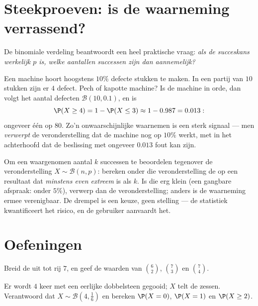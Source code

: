 \section{Steekproeven: is de waarneming verrassend?}

De binomiale verdeling beantwoordt een heel praktische vraag: \emph{als de
succeskans werkelijk $p$ is, welke aantallen successen zijn dan
aannemelijk?}

\begin{example}\label{ex:g11:binom:decision}
Een machine hoort hoogstens $10\%$ defecte stukken te maken. In een partij
van $10$ stukken zijn er $4$ defect. Pech of kapotte machine? Is de machine
in orde, dan volgt het aantal defecten $\mathcal B(10, 0.1)$, en is
\[
\P(X \geq 4) = 1 - \P(X \leq 3) \approx 1 - 0.987 = 0.013 :
\]
ongeveer één  op $80$. Zo'n onwaarschijnlijke  waarnemen is
een sterk signaal --- men \emph{verwerpt} de veronderstelling dat de machine
nog op $10\%$ werkt, met in het achterhoofd dat de beslissing met 
ongeveer $0.013$ fout kan zijn.
\end{example}

\begin{method}\label{met:g11:binom:decision}
Om een waargenomen aantal $k$ successen te beoordelen tegenover de
veronderstelling $X \sim \mathcal B(n, p)$: bereken onder die veronderstelling
de  op een resultaat dat \emph{minstens even extreem} is als $k$. Is die
 erg klein (een gangbare afspraak: onder $5\%$), verwerp dan de
veronderstelling; anders is de waarneming ermee verenigbaar. De drempel is een
keuze, geen stelling --- de statistiek kwantificeert het risico, en de
gebruiker aanvaardt het.
\end{method}

\section{Oefeningen}

\begin{exercise}[$\star$]\label{exo:g11:binom:1}
Breid de  uit tot rij $7$, en geef de waarden van
$\binom62$, $\binom{7}{3}$ en $\binom74$.
\end{exercise}

\begin{exercise}[$\star$]\label{exo:g11:binom:2}
Er wordt $4$ keer met een eerlijke dobbelsteen gegooid; $X$ telt de zessen.
Verantwoord dat $X \sim \mathcal B\left(4, \frac16\right)$ en bereken
$\P(X = 0)$, $\P(X = 1)$ en $\P(X \geq 2)$.
\end{exercise}

